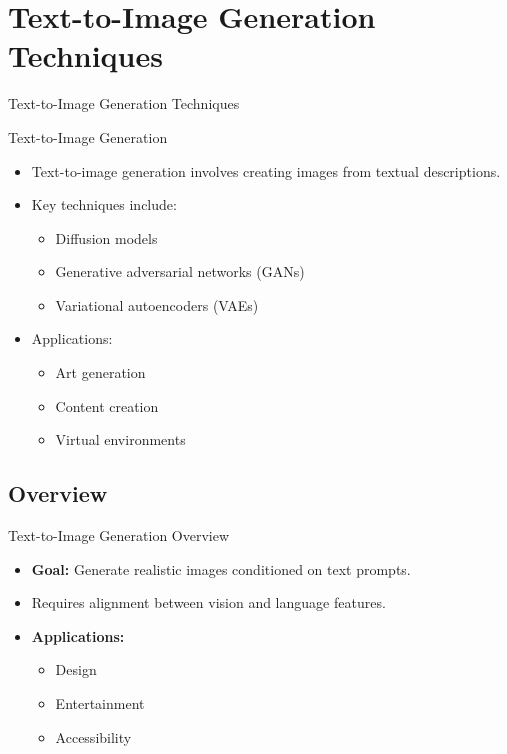 \section{Text-to-Image Generation Techniques}
\begin{frame}{}
    \LARGE Text-to-Image Generation Techniques
\end{frame}

\begin{frame}[allowframebreaks]{Text-to-Image Generation}
    \begin{itemize}
        \item Text-to-image generation involves creating images from textual descriptions.
        \item Key techniques include:
        \begin{itemize}
            \item Diffusion models
            \item Generative adversarial networks (GANs)
            \item Variational autoencoders (VAEs)
        \end{itemize}
        \item Applications:
        \begin{itemize}
            \item Art generation
            \item Content creation
            \item Virtual environments
        \end{itemize}
    \end{itemize}
\framebreak
    \begin{figure}
        \centering
    \end{figure}
\end{frame}

\subsection{Overview}
\begin{frame}{Text-to-Image Generation Overview}
    \begin{itemize}
        \item \textbf{Goal:} Generate realistic images conditioned on text prompts.
        \item Requires alignment between vision and language features.
        \item \textbf{Applications:}
        \begin{itemize}
            \item Design
            \item Entertainment
            \item Accessibility
        \end{itemize}
    \end{itemize}
\end{frame}

